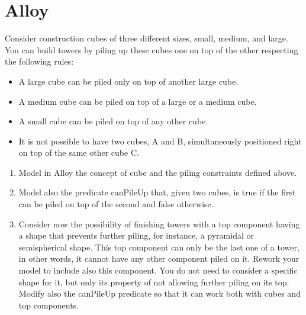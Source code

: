 \documentclass[12pt, a4paper]{report}
\newtheorem[style=M,bodystyle=\normalfont]{theorem}{Theorem}
\newtheorem[style=M,bodystyle=\normalfont]{corollary}{Corollary}
\newtheorem[style=M,bodystyle=\normalfont]{lemma}{Lemma}
\newtheorem[style=M,bodystyle=\normalfont]{definition}{Definition}
\begin{document}
    \section{Alloy}
        Consider construction cubes of three different sizes, small, medium, and large. You can build towers by piling up these cubes one on top of the other respecting the following rules:
        \begin{itemize}
            \item A large cube can be piled only on top of another large cube.
            \item A medium cube can be piled on top of a large or a medium cube.
            \item A small cube can be piled on top of any other cube.
            \item It is not possible to have two cubes, A and B, simultaneously positioned right on top of the same other cube C. 
        \end{itemize}
        \begin{enumerate}
            \item Model in Alloy the concept of cube and the piling constraints defined above.
            \item Model also the predicate canPileUp that, given two cubes, is true if the first can be piled on top of the second and false otherwise.
            \item Consider now the possibility of finishing towers with a top component having a shape that prevents further piling, for instance, a pyramidal 
                or semispherical shape. This top component can only be the last one of a tower, in other words, it cannot have any other component piled on it.
                Rework your model to include also this component. You do not need to consider a specific shape for it, but only its property of not allowing further 
                piling on its top. Modify also the canPileUp predicate so that it can work both with cubes and top components.
        \end{enumerate}
\end{document}
